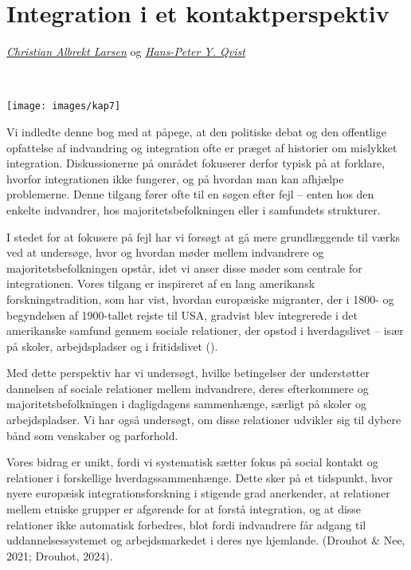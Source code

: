 \documentclass[
]{book}
\begin{document}
\chapter{Integration i et kontaktperspektiv}\label{kap7}

\emph{\href{https://vbn.aau.dk/en/persons/albrekt}{Christian Albrekt Larsen}} og \emph{\href{https://vbn.aau.dk/en/persons/hpq}{Hans-Peter Y. Qvist}}

~~~~

\texttt{[image: images/kap7]}

\newpage

Vi indledte denne bog med at påpege, at den politiske debat og den offentlige opfattelse af indvandring og integration ofte er præget af historier om mislykket integration. Diskussionerne på området fokuserer derfor typisk på at forklare, hvorfor integrationen ikke fungerer, og på hvordan man kan afhjælpe problemerne. Denne tilgang fører ofte til en søgen efter fejl -- enten hos den enkelte indvandrer, hos majoritetsbefolkningen eller i samfundets strukturer.

I stedet for at fokusere på fejl har vi forsøgt at gå mere grundlæggende til værks ved at undersøge, hvor og hvordan møder mellem indvandrere og majoritetsbefolkningen opstår, idet vi anser disse møder som centrale for integrationen. Vores tilgang er inspireret af en lang amerikansk forskningstradition, som har vist, hvordan europæiske migranter, der i 1800- og begyndelsen af 1900-tallet rejste til USA, gradvist blev integrerede i det amerikanske samfund gennem sociale relationer, der opstod i hverdagslivet -- især på skoler, arbejdspladser og i fritidslivet ().

Med dette perspektiv har vi undersøgt, hvilke betingelser der understøtter dannelsen af sociale relationer mellem indvandrere, deres efterkommere og majoritetsbefolkningen i dagligdagens sammenhænge, særligt på skoler og arbejdspladser. Vi har også undersøgt, om disse relationer udvikler sig til dybere bånd som venskaber og parforhold.

Vores bidrag er unikt, fordi vi systematisk sætter fokus på social kontakt og relationer i forskellige hverdagssammenhænge. Dette sker på et tidspunkt, hvor nyere europæisk integrationsforskning i stigende grad anerkender, at relationer mellem etniske grupper er afgørende for at forstå integration, og at disse relationer ikke automatisk forbedres, blot fordi indvandrere får adgang til uddannelsessystemet og arbejdsmarkedet i deres nye hjemlande. (Drouhot \& Nee, 2021; Drouhot, 2024).
\end{document}

